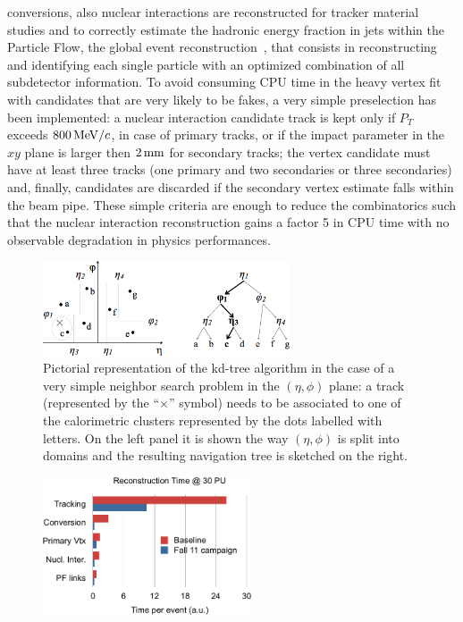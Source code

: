 \begin{description}
  conversions, also nuclear interactions are reconstructed for tracker
  material studies and to correctly estimate the hadronic energy
  fraction in jets within the Particle Flow, the global event
  reconstruction~\cite{pf1}\cite{pf2},
  that consists in reconstructing and identifying each
  single particle with an optimized combination of all subdetector
  information. To avoid consuming CPU
  time in the heavy vertex fit with candidates that are very likely to
  be fakes, a very simple preselection has been implemented: a nuclear
  interaction candidate track is kept only if $P_T$ exceeds
  $800{\rm \, MeV}/c$, in case of primary tracks, or if the impact parameter in
  the $xy$ plane is larger then
  $2\rm \, mm$ for secondary tracks; the vertex candidate must have at least
  three tracks (one primary and two secondaries or three secondaries)
  and, finally, candidates are discarded if the
  secondary vertex estimate falls within the beam pipe. These simple
  criteria are enough to reduce the combinatorics such that the
  nuclear interaction reconstruction gains a factor 5 in CPU time with
  no observable degradation in physics performances.
\begin{figure}[t]
\begin{center}
\includegraphics*[width=0.65\textwidth]{figs/kdtree.png}
\caption{Pictorial representation of the kd-tree algorithm in the case
  of a very simple neighbor search problem in the $(\eta, \phi)$
  plane: a track (represented by the ``$\times$'' symbol) needs to be
  associated to one of the calorimetric clusters represented by the
  dots labelled with letters. On the left panel it is shown the way
  $(\eta, \phi)$ is split into domains and the resulting navigation tree is
  sketched on the right.}
\label{fig:kdtree}
\end{center}
\end{figure}
\begin{figure}[b]
\includegraphics*[width=0.55\textwidth]{figs/recotime.png}\hspace{0.02\textwidth}%

\end{figure}
\end{description}
